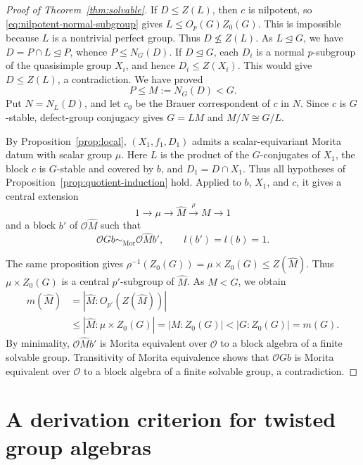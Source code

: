 \documentclass[11pt,a4paper]{article}
\theoremstyle{definition}
\theoremstyle{remark}
\numberwithin{equation}{section}
\newcommand{\cO}{\mathcal{O}}
\newcommand{\Mor}{\mathrm{Mor}}
\begin{document}
\begin{proof}[Proof of Theorem~\ref{thm:solvable}]
		If $D\leq Z(L)$, then $c$ is nilpotent, so
		\eqref{eq:nilpotent-normal-subgroup} gives
		$L\leq O_p(G)Z_0(G)$. This is impossible because $L$ is a
		nontrivial perfect group. Thus $D\not\leq Z(L)$.
		As $L\unlhd G$, we have $D=P\cap L\unlhd P$, whence
		$P\leq N_G(D)$. If $D\unlhd G$, each $D_i$ is a normal
		$p$-subgroup of the quasisimple group $X_i$, and hence
		$D_i\leq Z(X_i)$. This would give $D\leq Z(L)$, a
		contradiction. We have proved
		\[
		P\leq M:=N_G(D)<G.
		\]
		Put $N=N_L(D)$, and let $c_0$ be the Brauer correspondent
		of $c$ in $N$. Since $c$ is $G$-stable, defect-group
		conjugacy gives $G=LM$ and $M/N\cong G/L$.
		
		By Proposition~\ref{prop:local}, $(X_1,f_1,D_1)$ admits a
		scalar-equivariant Morita datum with scalar group $\mu$.
		Here $L$ is the product of the $G$-conjugates of $X_1$,
		the block $c$ is $G$-stable and covered by $b$, and
		$D_1=D\cap X_1$. Thus all hypotheses of
		Proposition~\ref{prop:quotient-induction} hold. Applied to $b$,
		$X_1$, and $c$, it gives a central extension
		\[
		1\longrightarrow\mu\longrightarrow\widehat M
		\xrightarrow{\rho}M\longrightarrow1
		\]
		and a block $b'$ of $\cO\widehat M$ such that
		\[
		\cO Gb\sim_{\Mor}\cO\widehat M b',\qquad l(b')=l(b)=1.
		\]
		
		The same proposition gives
		$\rho^{-1}(Z_0(G))=\mu\times Z_0(G)\leq Z(\widehat M)$.
		Thus $\mu\times Z_0(G)$ is a central $p'$-subgroup of $\widehat M$.
		As $M<G$, we obtain
		\begin{align}
			m(\widehat M)
			&=|\widehat M:O_{p'}(Z(\widehat M))|\nonumber\\
			&\leq|\widehat M:\mu\times Z_0(G)|
			=|M:Z_0(G)|<|G:Z_0(G)|=m(G).\label{eq:strict-central-index}
		\end{align}
		By minimality, $\cO\widehat M b'$ is Morita equivalent over $\cO$
		to a block algebra of a finite solvable group. Transitivity of Morita
		equivalence shows that $\cO Gb$ is Morita equivalent over $\cO$ to a
		block algebra of a finite solvable group, a contradiction.
	\end{proof}
	
	
	\section{A derivation criterion for twisted group algebras}\label{sec:derivations}
	
\end{document}
